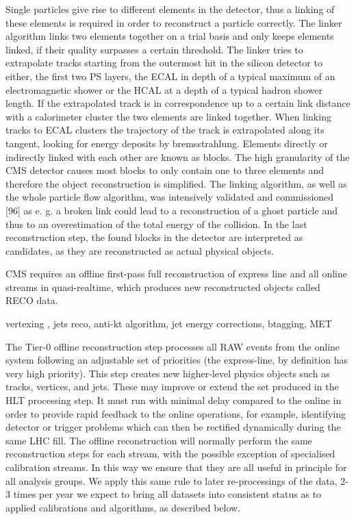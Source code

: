 Single particles give rise to different elements in the detector, thus a linking of these elements is required in order to reconstruct a particle correctly. The linker algorithm links two elements together on a trial basis and only keeps elements linked, if their quality surpasses a certain threshold. The linker tries to extrapolate tracks starting from the outermost hit in the silicon detector to either, the first two PS layers, the ECAL in depth of a typical maximum of an electromagnetic shower or the HCAL at a depth of a typical hadron shower length. If the extrapolated track is in correspondence up to a certain link distance with a calorimeter cluster the two elements are linked together. When linking tracks to ECAL clusters the trajectory of the track is extrapolated along its tangent, looking for energy deposits by bremsstrahlung. Elements directly or indirectly linked with each other are known as blocks. The high granularity of the CMS detector causes most blocks to only contain one to three elements and therefore the object reconstruction is simplified. The linking algorithm, as well as the whole particle flow algorithm, was intensively validated and commissioned [96] as e. g. a broken link could lead to a reconstruction of a ghost particle and thus to an overestimation of the total energy of the collision. In the last reconstruction step, the found blocks in the detector are interpreted as candidates, as they are reconstructed as actual physical objects.




CMS requires an offline first-pass full reconstruction of express line and all
online streams in quasi-realtime, which produces new reconstructed objects
called RECO data.




 vertexing , jets reco, anti-kt algorithm, jet energy corrections, btagging, MET 





The Tier-0 offline reconstruction step processes all RAW events from the online system following
an adjustable set of priorities (the express-line, by definition has very high priority). This step
creates new higher-level physics objects such as tracks, vertices, and jets. These may improve or
extend the set produced in the HLT processing step. It must run with minimal delay compared
to the online in order to provide rapid feedback to the online operations, for example, identifying
detector or trigger problems which can then be rectified dynamically during the same LHC fill.
The offline reconstruction will normally perform the same reconstruction steps for each stream,
with the possible exception of specialised calibration streams. In this way we ensure that they
are all useful in principle for all analysis groups. We apply this same rule to later re-processings
of the data, 2-3 times per year we expect to bring all datasets into consistent status as to applied
calibrations and algorithms, as described below.





